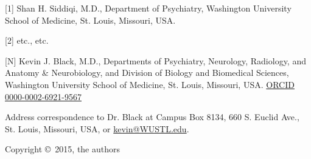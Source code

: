 [1] Shan H. Siddiqi, M.D., Department of Psychiatry, Washington University School of Medicine, St. Louis, Missouri, USA.

[2] etc., etc.

[N] Kevin J. Black, M.D., Departments of Psychiatry, Neurology, Radiology, and Anatomy \& Neurobiology, and Division of Biology and Biomedical Sciences, Washington University School of Medicine, St. Louis, Missouri, USA.  \href{http://orcid.org/0000-0002-6921-9567}{ORCID 0000-0002-6921-9567}

Address correspondence to Dr. Black at Campus Box 8134, 660 S. Euclid Ave., St. Louis, Missouri, USA, or \href{mailto:kevin@WUSTL.edu}{kevin@WUSTL.edu}.

Copyright \copyright\, 2015, the authors